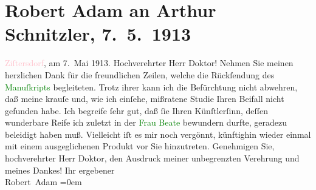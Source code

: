 

               \section[Robert Adam an Arthur Schnitzler, 7. 5. 1913]{ Robert Adam an Arthur Schnitzler, 7. 5. 1913}\nopagebreak{}\rehead{ }\normalsize\beginnumbering{} \toendnotes[C]{\smallbreak\pagebreak[2]} 
\toendnotes[C]{\smallbreak}\pstart
           \raggedleft{}{\pb}\textcolor{pink}{Ziſtersdorf}{}\ledrightnote{\textcolor{pink}{Zistersdorf}}, am 7. Mai 1913.
                    \pend
           \pstart{}Hochverehrter Herr Doktor!\pend\pstart
           Nehmen Sie meinen herzlichen Dank für die freundlichen Zeilen, welche die
                    Rückſendung des \textcolor{green}{Manuſkripts}{}
                    begleiteten.\pend
           \pstart
           Trotz ihrer kann ich die Befürchtung nicht abwehren, daß meine krauſe und, wie
                    ich einſehe, mißratene Studie Ihren Beifall nicht gefunden habe. Ich begreife
                    ſehr gut, daß ſie Ihren Künſtlerſinn, deſſen wunderbare Reife ich zuletzt in der
                        \textcolor{green}{Frau Beate}{}\ledrightnote{\textcolor{green}{Frau Beate und ihr Sohn. Novelle}} bewundern durfte, geradezu
                    beleidigt haben muß.\pend
           \pstart
           Vielleicht iſt es mir noch vergönnt, künftighin wieder einmal mit einem
                    ausgeglichenen Produkt vor Sie hinzutreten.\pend
           \pstart
           Genehmigen Sie, hochverehrter Herr {\pb}Doktor, den Ausdruck
                    meiner unbegrenzten Verehrung und meines Dankes!\pend
           \pstart
           Ihr ergebener{\\[\baselineskip]}\spacefill\mbox{Robert Adam}\pend
           \leftskip=0em{}\endnumbering{}  
      